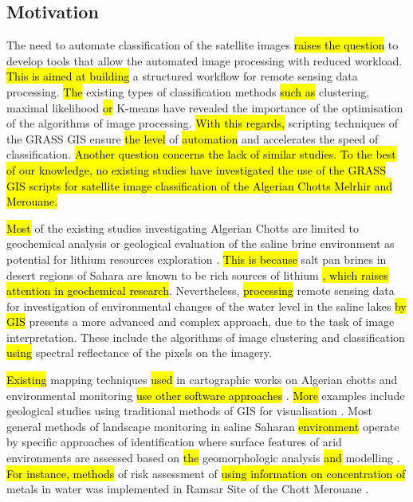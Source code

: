 \documentclass[asi,article,submit,pdftex,moreauthors]{Definitions/mdpi}
\begin{document}
\subsection{Motivation}

The need to automate classification of the satellite images \hl{raises the question} to develop tools that allow the automated image processing with reduced workload. \hl{This is aimed at building} a structured workflow for remote sensing data processing. \hl{The }existing types of classification methods \hl{such as }clustering, maximal likelihood \hl{or} K-means\hl{ }have revealed the importance of the optimisation of the algorithms of image processing. \hl{With this regards, }scripting techniques of the GRASS GIS ensure \hl{the level} of \hl{automation }and accelerates the speed of classification. \hl{Another question concerns the lack of similar studies. To the best of our knowledge, no existing studies have investigated the use of the GRASS GIS scripts for satellite image classification of the Algerian Chotts Melrhir and Merouane.}

\hl{Most} of the existing studies investigating Algerian Chotts are limited to geochemical analysis \cite{Hacini,Hacinietal2006,MOULLA201264} or geological evaluation of the saline brine environment as potential for lithium resources exploration \cite{KESLER201255,FLEXER20181188}. \hl{This is because} salt pan brines in desert regions of Sahara are known to be rich sources of lithium \cite{ZATOUT2020104566}\hl{, which raises attention in geochemical research}. Nevertheless, \hl{processing} remote sensing data for investigation of environmental changes of the water level in the saline lakes \hl{by GIS }presents a more advanced and complex approach, due to the task of image interpretation. These include the algorithms of image clustering and classification \hl{using} spectral reflectance of the pixels on the imagery.

\hl{Existing} mapping techniques \hl{used} in cartographic works on Algerian chotts and environmental monitoring \hl{use other software approaches }\cite{ABDENNOUR2020100087,OUERDACHI2012426,HADOUR2020100671}. \hl{More }examples include geological studies using traditional methods of GIS for visualisation \cite{RAHAL2021104983,LAOUINI201959,HADDANE2017228}. Most general methods of landscape monitoring in saline Saharan \hl{environment} operate by specific approaches of identification where\hl{ }surface features of arid environments are assessed based on \hl{the }geomorphologic analysis \hl{and} modelling \cite{Callot}. \hl{For instance, methods} of risk assessment of \hl{using information on concentration of }metals in water was implemented in Ramsar Site of the Chott Merouane \cite{Benhaddya}. 
\end{document}
